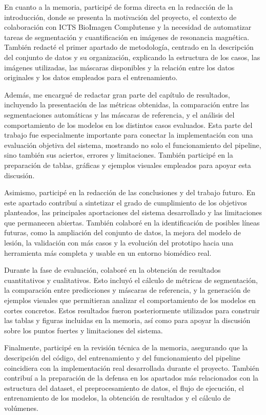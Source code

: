 En cuanto a la memoria, participé de forma directa en la redacción de la introducción, donde se presenta la motivación del proyecto, el contexto de colaboración con ICTS BioImagen Complutense y la necesidad de automatizar tareas de segmentación y cuantificación en imágenes de resonancia magnética. También redacté el primer apartado de metodología, centrado en la descripción del conjunto de datos y su organización, explicando la estructura de los casos, las imágenes utilizadas, las máscaras disponibles y la relación entre los datos originales y los datos empleados para el entrenamiento.

Además, me encargué de redactar gran parte del capítulo de resultados, incluyendo la presentación de las métricas obtenidas, la comparación entre las segmentaciones automáticas y las máscaras de referencia, y el análisis del comportamiento de los modelos en los distintos casos evaluados. Esta parte del trabajo fue especialmente importante para conectar la implementación con una evaluación objetiva del sistema, mostrando no solo el funcionamiento del pipeline, sino también sus aciertos, errores y limitaciones. También participé en la preparación de tablas, gráficas y ejemplos visuales empleados para apoyar esta discusión.

Asimismo, participé en la redacción de las conclusiones y del trabajo futuro. En este apartado contribuí a sintetizar el grado de cumplimiento de los objetivos planteados, las principales aportaciones del sistema desarrollado y las limitaciones que permanecen abiertas. También colaboré en la identificación de posibles líneas futuras, como la ampliación del conjunto de datos, la mejora del modelo de lesión, la validación con más casos y la evolución del prototipo hacia una herramienta más completa y usable en un entorno biomédico real.

Durante la fase de evaluación, colaboré en la obtención de resultados cuantitativos y cualitativos. Esto incluyó el cálculo de métricas de segmentación, la comparación entre predicciones y máscaras de referencia, y la generación de ejemplos visuales que permitieran analizar el comportamiento de los modelos en cortes concretos. Estos resultados fueron posteriormente utilizados para construir las tablas y figuras incluidas en la memoria, así como para apoyar la discusión sobre los puntos fuertes y limitaciones del sistema.

Finalmente, participé en la revisión técnica de la memoria, asegurando que la descripción del código, del entrenamiento y del funcionamiento del pipeline coincidiera con la implementación real desarrollada durante el proyecto. También contribuí a la preparación de la defensa en los apartados más relacionados con la estructura del dataset, el preprocesamiento de datos, el flujo de ejecución, el entrenamiento de los modelos, la obtención de resultados y el cálculo de volúmenes.